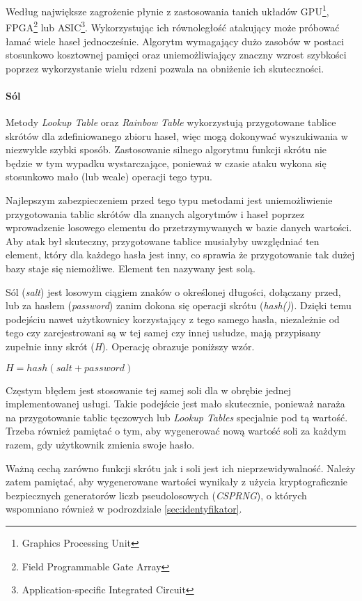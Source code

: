 \documentclass[11pt]{aghdpl}
\begin{document}
Według \cite{RIG} największe zagrożenie płynie z zastosowania tanich układów GPU\footnote{Graphics Processing Unit}, FPGA\footnote{Field Programmable Gate Array} lub ASIC\footnote{Application-specific Integrated Circuit}. Wykorzystując ich równoległość atakujący może próbować łamać wiele haseł jednocześnie. Algorytm wymagający dużo zasobów w postaci stosunkowo kosztownej pamięci oraz uniemożliwiający znaczny wzrost szybkości poprzez wykorzystanie wielu rdzeni pozwala na obniżenie ich skuteczności. 

\paragraph{Sól}

Metody \emph{Lookup Table} oraz \emph{Rainbow Table} wykorzystują przygotowane tablice skrótów dla zdefiniowanego zbioru haseł, więc mogą dokonywać wyszukiwania w niezwykle szybki sposób. Zastosowanie silnego algorytmu funkcji skrótu nie będzie w tym wypadku wystarczające, ponieważ w czasie ataku wykona się stosunkowo mało (lub wcale) operacji tego typu.

Najlepszym zabezpieczeniem przed tego typu metodami jest uniemożliwienie przygotowania tablic skrótów dla znanych algorytmów i haseł poprzez wprowadzenie losowego elementu do przetrzymywanych w bazie danych wartości. Aby atak był skuteczny, przygotowane tablice musiałyby uwzględniać ten element, który dla każdego hasła jest inny, co sprawia że przygotowanie tak dużej bazy staje się niemożliwe. Element ten nazywany jest solą.

Sól (\emph{salt}) jest losowym ciągiem znaków o określonej długości, dołączany przed, lub za hasłem (\emph{password}) zanim dokona się operacji skrótu (\emph{hash()}). Dzięki temu podejściu nawet użytkownicy korzystający z tego samego hasła, niezależnie od tego czy zarejestrowani są w tej samej czy innej usłudze, mają przypisany zupełnie inny skrót (\emph{H}). Operację obrazuje poniższy wzór.

$H = hash(salt + password)$

Częstym błędem jest stosowanie tej samej soli dla w obrębie jednej implementowanej usługi. Takie podejście jest mało skutecznie, ponieważ naraża na przygotowanie tablic tęczowych lub \emph{Lookup Tables} specjalnie pod tą wartość. Trzeba również pamiętać o tym, aby wygenerować nową wartość soli za każdym razem, gdy użytkownik zmienia swoje hasło.

Ważną cechą zarówno funkcji skrótu jak i soli jest ich nieprzewidywalność. Należy zatem pamiętać, aby wygenerowane wartości wynikały z użycia kryptograficznie bezpiecznych generatorów liczb pseudolosowych (\emph{CSPRNG}), o których wspomniano również w podrozdziale \ref{sec:identyfikator}.
\end{document}
